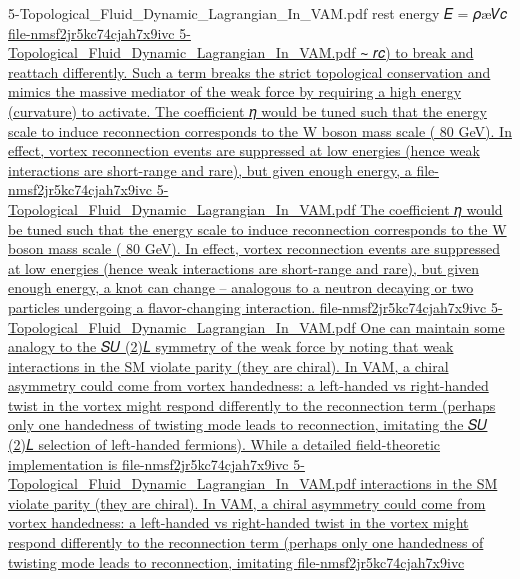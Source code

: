 {5-Topological_Fluid_Dynamic_Lagrangian_In_VAM.pdf
rest energy 𝐸 = 𝜌æ𝑉𝑐
}\href{file://xn--file-nmsf2jr5kc74cjah7x9ivc%23:~:text=%20rc,but%20given%20enough%20energy,%20a-1707c/}{file-nmsf2jr5kc74cjah7x9ivc
5-Topological_Fluid_Dynamic_Lagrangian_In_VAM.pdf
∼ 𝑟𝑐) to break and reattach differently. Such a term breaks the strict topological conservation and mimics the massive mediator of the weak force by requiring a high energy (curvature) to activate. The coefficient 𝜂 would be tuned such that the energy scale to induce reconnection corresponds to the W boson mass scale ( 80 GeV). In effect, vortex reconnection events are suppressed at low energies (hence weak interactions are short-range and rare), but given enough energy, a
}\href{file://xn--file-nmsf2jr5kc74cjah7x9ivc%23:~:text=the%20coefficient%20%20would%20be,changing%20interaction-s47d/}{file-nmsf2jr5kc74cjah7x9ivc
5-Topological_Fluid_Dynamic_Lagrangian_In_VAM.pdf
The coefficient 𝜂 would be tuned such that the energy scale to induce reconnection corresponds to the W boson mass scale ( 80 GeV). In effect, vortex reconnection events are suppressed at low energies (hence weak interactions are short-range and rare), but given enough energy, a knot can change – analogous to a neutron decaying or two particles undergoing a flavor-changing interaction.
}\href{file://file-nmsf2jr5kc74cjah7x9ivc%23:~:text=one%20can%20maintain%20some%20analogy,theoretic%20implementation%20is/}{file-nmsf2jr5kc74cjah7x9ivc
5-Topological_Fluid_Dynamic_Lagrangian_In_VAM.pdf
One can maintain some analogy to the 𝑆𝑈 (2)𝐿 symmetry of the weak force by noting that weak interactions in the SM violate parity (they are chiral). In VAM, a chiral asymmetry could come from vortex handedness: a left-handed vs right-handed twist in the vortex might respond differently to the reconnection term (perhaps only one handedness of twisting mode leads to reconnection, imitating the 𝑆𝑈 (2)𝐿 selection of left-handed fermions). While a detailed field-theoretic implementation is
}\href{file://file-nmsf2jr5kc74cjah7x9ivc%23:~:text=interactions%20in%20the%20sm%20violate,mode%20leads%20to%20reconnection,%20imitating/}{file-nmsf2jr5kc74cjah7x9ivc
5-Topological_Fluid_Dynamic_Lagrangian_In_VAM.pdf
interactions in the SM violate parity (they are chiral). In VAM, a chiral asymmetry could come from vortex handedness: a left-handed vs right-handed twist in the vortex might respond differently to the reconnection term (perhaps only one handedness of twisting mode leads to reconnection, imitating
}\href{file://xn--file-nmsf2jr5kc74cjah7x9ivc%23:~:text=atom%20could%20be%20viewed%20as,knit%20fashion%20%20a%20bit-5y06d/}{file-nmsf2jr5kc74cjah7x9ivc
}
